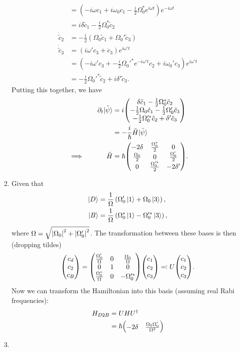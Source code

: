 \documentclass[12pt]{article}
\begin{document}
\begin{enumerate}[label=(\alph*)]
\begin{align*}
        &= \left(-i\omega c_1 + i\omega_0c_1 - \frac{i}{2}\Omega_0^*e^{i\omega t}\right)e^{-i\omega t} \\
        &= i\delta\tilde{c}_1 - \frac{i}{2}\Omega_0^*\tilde{c}_2 \\
        \dot{\tilde{c}}_2 &= -\frac{i}{2}\left(\Omega_0\tilde{c}_1 + \Omega_0'\tilde{c}_3\right) \\
        \dot{\tilde{c}}_3 &= \left(i\omega'c_3 + \dot{c}_3\right)e^{i\omega't} \\
        &= \left(-i\omega'c_3 + -\frac{i}{2}\Omega_0'^*e^{-i\omega't}c_2 + i\omega_0'c_3\right)e^{i\omega't} \\
        &= -\frac{i}{2}\Omega_0'^* \tilde{c}_2 + i\delta'\tilde{c}_3.
    \end{align*}
    Putting this together, we have
    \begin{alignat*}{3}
        &\quad & \partial_t \tilde{\ket{\psi}} &= i\mqty(\delta\tilde{c}_1 - \frac{1}{2}\Omega_0^*\tilde{c}_2 \\ -\frac{1}{2}\Omega_0\tilde{c}_1 - \frac{1}{2}\Omega_0'\tilde{c}_3 \\ -\frac{1}{2}\Omega_0'^*\tilde{c}_2 + \delta'\tilde{c}_3) \\
        &\quad & &= -\frac{i}{\hbar}\tilde{H}\tilde{\ket{\psi}} \\
        &\implies\quad & \tilde{H} &= \hbar\mqty(-2\delta & \frac{\Omega_0^*}{2} & 0 \\ \frac{\Omega_0}{2} & 0 & \frac{\Omega_0'}{2} \\ 0 & \frac{\Omega_0'^*}{2} & -2\delta').
    \end{alignat*}
    \item Given that
    \begin{align*}
        \ket{D} &= \frac{1}{\Omega}\left(\Omega_0'\ket{1} + \Omega_0\ket{3}\right), \\
        \ket{B} &= \frac{1}{\Omega}\left(\Omega_0^*\ket{1} - \Omega_0'^*\ket{3}\right),
    \end{align*}
    where $\Omega = \sqrt{\abs{\Omega_0}^2 + \abs{\Omega_0'}^2}$.
    The transformation between these bases is then (dropping tildes)
    \[ \mqty(c_d\\c_2\\c_B) = \mqty(\frac{\Omega_0'}{\Omega}&0&\frac{\Omega_0}{\Omega}\\0&1&0\\\frac{\Omega_0^*}{\Omega}&0&-\Omega_0'^*)\mqty(c_1\\c_2\\c_3) \eqcolon U\mqty(c_1\\c_2\\c_3). \]
    Now we can transform the Hamiltonian into this basis (assuming real Rabi frequencies):
    \begin{align*}
        H_{D2B} &= UHU^\dag \\
        &= \hbar\mqty(-2\delta & \frac{\Omega_0\Omega_0'}{\Omega^2})
    \end{align*}

    \item
\end{enumerate}
\end{document}
